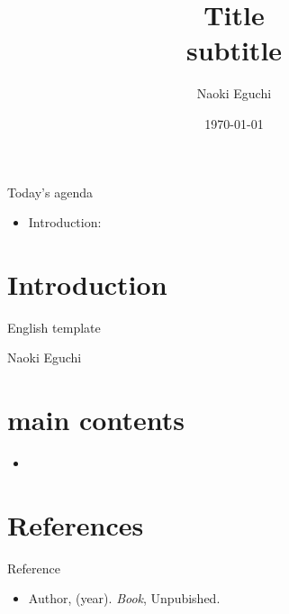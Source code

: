 \documentclass[xcolor=svgnames,aspectratio=169]{beamer}
\begin{document}
 

\title{Title\\ \small{subtitle}}
\author{Naoki Eguchi}          
\date{\today}

\begin{frame}                  
    \titlepage                     
\end{frame}

\begin{frame}{Today's agenda}                  
    \begin{itemize}
        \item Introduction: 
    \end{itemize}
\end{frame}

\section{Introduction}

\begin{frame}{English template}
    \begin{definition}[name]
        Naoki Eguchi
    \end{definition}
\end{frame}

\section{main contents}

\begin{frame}
    \begin{itemize}
        \item 
    \end{itemize}
\end{frame}

\section*{References}

\begin{frame}{Reference}
    \begin{itemize}
        \item Author, (year). 
        \textit{Book}, Unpubished.
    \end{itemize}
\end{frame}
\end{document}
